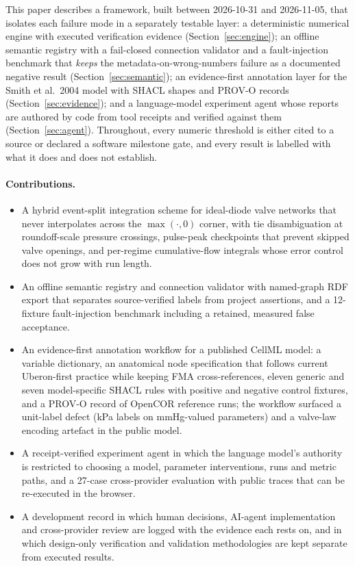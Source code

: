 \documentclass[11pt,letterpaper]{article}
\begin{document}
This paper describes a framework, built between 2026-10-31 and 2026-11-05, that isolates each failure mode in a separately testable layer: a deterministic numerical engine with executed verification evidence (Section~\ref{sec:engine}); an offline semantic registry with a fail-closed connection validator and a fault-injection benchmark that \emph{keeps} the metadata-on-wrong-numbers failure as a documented negative result (Section~\ref{sec:semantic}); an evidence-first annotation layer for the Smith et al.\ 2004 model with SHACL shapes and PROV-O records (Section~\ref{sec:evidence}); and a language-model experiment agent whose reports are authored by code from tool receipts and verified against them (Section~\ref{sec:agent}). Throughout, every numeric threshold is either cited to a source or declared a software milestone gate, and every result is labelled with what it does and does not establish.

\paragraph{Contributions.}
\begin{itemize}[leftmargin=*]
\item A hybrid event-split integration scheme for ideal-diode valve networks that never interpolates across the $\max(\cdot,0)$ corner, with tie disambiguation at roundoff-scale pressure crossings, pulse-peak checkpoints that prevent skipped valve openings, and per-regime cumulative-flow integrals whose error control does not grow with run length.
\item An offline semantic registry and connection validator with named-graph RDF export that separates source-verified labels from project assertions, and a 12-fixture fault-injection benchmark including a retained, measured false acceptance.
\item An evidence-first annotation workflow for a published CellML model: a variable dictionary, an anatomical node specification that follows current Uberon-first practice while keeping FMA cross-references, eleven generic and seven model-specific SHACL rules with positive and negative control fixtures, and a PROV-O record of OpenCOR reference runs; the workflow surfaced a unit-label defect (kPa labels on mmHg-valued parameters) and a valve-law encoding artefact in the public model.
\item A receipt-verified experiment agent in which the language model's authority is restricted to choosing a model, parameter interventions, runs and metric paths, and a 27-case cross-provider evaluation with public traces that can be re-executed in the browser.
\item A development record in which human decisions, AI-agent implementation and cross-provider review are logged with the evidence each rests on, and in which design-only verification and validation methodologies are kept separate from executed results.
\end{itemize}
\end{document}
